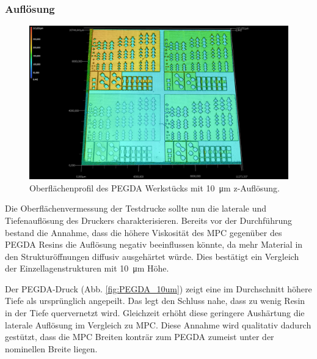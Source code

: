 \clearpage
\subsubsection{Auflösung}

\begin{figure}[!h]
    \centering
    \includegraphics[width=\linewidth]{img/PEGDA-10um-3d.png}
    \caption{Oberflächenprofil des PEGDA Werkstücks mit \SI{10}{\micro\meter} z-Auflösung.}
    \label{fig:Surface_PEGDA_10um}
\end{figure}

Die Oberflächenvermessung der Testdrucke sollte nun die laterale und Tiefenauflösung des Druckers charakterisieren. Bereits vor der Durchführung bestand die Annahme, dass die höhere Viskosität des MPC gegenüber des PEGDA Resins die Auflösung negativ beeinflussen könnte, da mehr Material in den Strukturöffnungen diffusiv ausgehärtet würde.
Dies bestätigt ein Vergleich der Einzellagenstrukturen mit \SI{10}{\micro\meter} Höhe.

Der PEGDA-Druck (Abb. \ref{fig:PEGDA_10um}) zeigt eine im Durchschnitt höhere Tiefe als ursprünglich angepeilt. Das legt den Schluss nahe, dass zu wenig Resin in der Tiefe quervernetzt wird. Gleichzeit erhöht diese geringere Aushärtung die laterale Auflösung im Vergleich zu MPC. Diese Annahme wird qualitativ dadurch gestützt, dass die MPC Breiten konträr zum PEGDA zumeist unter der nominellen Breite liegen.

